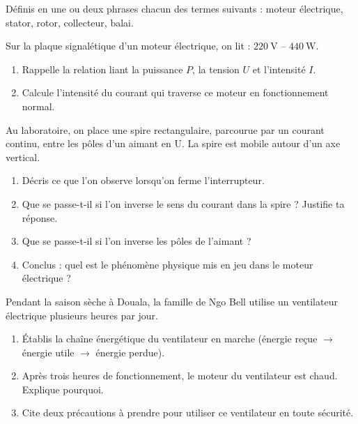 \documentclass[11pt]{article}
\newcommand{\cle}[1]{{\popxbold\color{popdark}#1}}
\newcounter{popsec}
\newcounter{popsub}
\newcommand{\courssub}[1]{%
  \stepcounter{popsub}%
  \par\vspace{9pt}\noindent{\popxbold\fontsize{11.5}{13}\selectfont\color{popink}{\color{poporange}\thepopsec.\thepopsub}\hspace{6pt}#1}\par\nopagebreak\vspace{4pt}
}
\begin{document}
\begin{exercice}[Définitions]
Définis en une ou deux phrases chacun des termes suivants : \cle{moteur électrique}, \cle{stator}, \cle{rotor}, \cle{collecteur}, \cle{balai}.
\end{exercice}

\begin{exercice}
Sur la plaque signalétique d'un moteur électrique, on lit : $220~\text{V}$ -- $440~\text{W}$.
\begin{enumerate}
\item Rappelle la relation liant la puissance $P$, la tension $U$ et l'intensité $I$.
\item Calcule l'intensité du courant qui traverse ce moteur en fonctionnement normal.
\end{enumerate}
\end{exercice}

\courssub{Je m'entraîne}

\begin{exercice}
Au laboratoire, on place une spire rectangulaire, parcourue par un courant continu, entre les pôles d'un aimant en U. La spire est mobile autour d'un axe vertical.
\begin{enumerate}
\item Décris ce que l'on observe lorsqu'on ferme l'interrupteur.
\item Que se passe-t-il si l'on inverse le sens du courant dans la spire ? Justifie ta réponse.
\item Que se passe-t-il si l'on inverse les pôles de l'aimant ?
\item Conclus : quel est le phénomène physique mis en jeu dans le moteur électrique ?
\end{enumerate}
\end{exercice}

\begin{exercice}
Pendant la saison sèche à Douala, la famille de Ngo Bell utilise un ventilateur électrique plusieurs heures par jour.
\begin{enumerate}
\item Établis la chaîne énergétique du ventilateur en marche (énergie reçue $\rightarrow$ énergie utile $\rightarrow$ énergie perdue).
\item Après trois heures de fonctionnement, le moteur du ventilateur est chaud. Explique pourquoi.
\item Cite deux précautions à prendre pour utiliser ce ventilateur en toute sécurité.
\end{enumerate}
\end{exercice}
\end{document}
